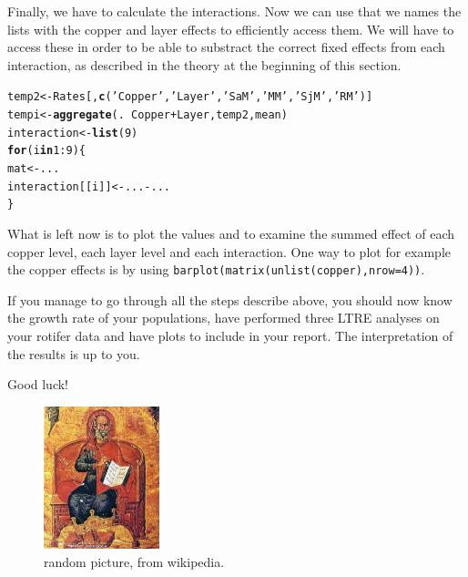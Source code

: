 \documentclass{article}\usepackage[]{graphicx}\usepackage[]{color}
\makeatletter
\newcommand{\hlnum}[1]{\textcolor[rgb]{0.686,0.059,0.569}{#1}}%
\newcommand{\hlstr}[1]{\textcolor[rgb]{0.192,0.494,0.8}{#1}}%
\newcommand{\hlopt}[1]{\textcolor[rgb]{0,0,0}{#1}}%
\newcommand{\hlstd}[1]{\textcolor[rgb]{0.345,0.345,0.345}{#1}}%
\newcommand{\hlkwa}[1]{\textcolor[rgb]{0.161,0.373,0.58}{\textbf{#1}}}%
\newcommand{\hlkwb}[1]{\textcolor[rgb]{0.69,0.353,0.396}{#1}}%
\newcommand{\hlkwd}[1]{\textcolor[rgb]{0.737,0.353,0.396}{\textbf{#1}}}%
\newenvironment{kframe}{%
 \def\at@end@of@kframe{}%
 \ifinner\ifhmode%
  \def\at@end@of@kframe{\end{minipage}}%
  \begin{minipage}{\columnwidth}%
 \fi\fi%
 \def\FrameCommand##1{\hskip\@totalleftmargin \hskip-\fboxsep
 \colorbox{shadecolor}{##1}\hskip-\fboxsep
     \hskip-\linewidth \hskip-\@totalleftmargin \hskip\columnwidth}%
 \MakeFramed {\advance\hsize-\width
   \@totalleftmargin\z@ \linewidth\hsize
   \@setminipage}}%
 {\par\unskip\endMakeFramed%
 \at@end@of@kframe}
\newenvironment{knitrout}{}{} %
\makeatother
\begin{document}
Finally, we have to calculate the interactions. Now we can use that we names the lists with the copper and layer effects to efficiently access them. We will have to access these in order to be able to substract the correct fixed effects from each interaction, as described in the theory at the beginning of this section.
\begin{knitrout}
\color{fgcolor}\begin{kframe}
\begin{alltt}
\hlstd{temp2}  \hlkwb{<-} \hlstd{Rates[,}\hlkwd{c}\hlstd{(}\hlstr{'Copper'}\hlstd{,}\hlstr{'Layer'}\hlstd{,}\hlstr{'SaM'}\hlstd{,}\hlstr{'MM'}\hlstd{,}\hlstr{'SjM'}\hlstd{,}\hlstr{'RM'}\hlstd{)]}
\hlstd{tempi} \hlkwb{<-} \hlkwd{aggregate}\hlstd{(.}\hlopt{~}\hlstd{Copper}\hlopt{+}\hlstd{Layer,temp2,mean)}
\hlstd{interaction} \hlkwb{<-} \hlkwd{list}\hlstd{(}\hlnum{9}\hlstd{)}
\hlkwa{for}\hlstd{(i} \hlkwa{in} \hlnum{1}\hlopt{:}\hlnum{9}\hlstd{)\{}
  \hlstd{mat} \hlkwb{<-} \hlstd{...}
  \hlstd{interaction[[i]]} \hlkwb{<-} \hlstd{...} \hlopt{-} \hlstd{...}
\hlstd{\}}
\end{alltt}
\end{kframe}
\end{knitrout}
What is left now is to plot the values and to examine the summed effect of each copper level, each layer level and each interaction. One way to plot for example the copper effects is by using \texttt{barplot(matrix(unlist(copper),nrow=4))}. 


If you manage to go through all the steps describe above, you should now know the growth rate of your populations, have performed three LTRE analyses on your rotifer data and have plots to include in your report. The interpretation of the results is up to you.


\begin{center}
Good luck!
\end{center}

\begin{figure}[h]
\centering
\includegraphics[width=0.3\textwidth]{Hippocrate.jpg}
\caption{\label{fig:owl}random picture, from wikipedia.}
\end{figure}
\end{document}
